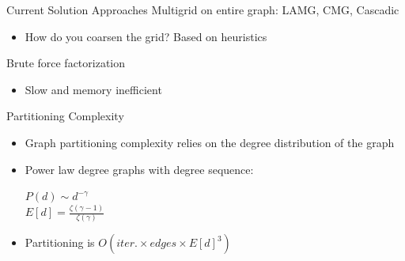 \documentclass[xcolor=dvipsnames,10pt]{beamer}
\begin{document}

\begin{frame}{Current Solution Approaches}
\large
Multigrid on entire graph: LAMG, CMG, Cascadic
\normalsize
\vspace{.2in}
\begin{itemize}
\item 

How do you coarsen the grid? Based on heuristics

\medskip
\end{itemize}
\vspace{.4in}
\large
Brute force factorization
\normalsize
\vspace{.2in}
\medskip
\begin{itemize}

\item Slow and memory inefficient
\end{itemize}
 

\end{frame}

\begin{frame}{Partitioning Complexity}
\begin{itemize}
\large
\item
Graph partitioning complexity relies on the degree distribution of the graph
\item
Power law degree graphs with degree sequence:
\begin{center}
\Large
\vspace{.15in}
$P(d) \sim d^{-\gamma}$\\
\vspace{.15in}
$E[d] = \frac{\zeta(\gamma - 1)}{\zeta(\gamma)}$
\end{center}
\vspace{.15in}
\large
\item
Partitioning is $O(iter. \times edges \times E[d]^3)$
\end{itemize}
\end{frame}

\end{document}
